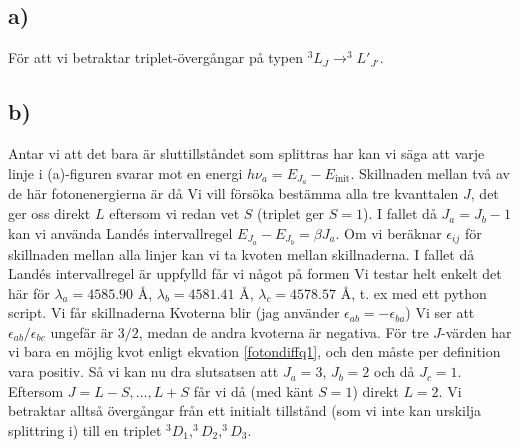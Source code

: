 \subsection{a)}
För att vi betraktar triplet-övergångar på typen $^3L_J \rightarrow  ^3L'_{J'}$.

\subsection{b)}
Antar vi att det bara är sluttillståndet som splittras har kan vi säga att varje linje i (a)-figuren
svarar mot en energi $h\nu_a = E_{J_a}-E_{\text{init}}$. Skillnaden mellan två av de här fotonenergierna är då
Vi vill försöka bestämma alla tre kvanttalen $J$, det ger oss direkt $L$ eftersom vi redan vet $S$ (triplet ger $S=1$).
I fallet då $J_a = J_b-1$ kan vi använda Landés intervallregel $E_{J_a}-E_{J_b} = \beta J_a$. Om vi beräknar $\epsilon_{ij}$
för skillnaden mellan alla linjer kan vi ta kvoten mellan skillnaderna. I fallet då Landés intervallregel är uppfylld får vi
något på formen
Vi testar helt enkelt det här för $\lambda_a = 4585.90$ Å, $\lambda_b = 4581.41$ Å, $\lambda_c = 4578.57$ Å, t. ex med ett
python script. Vi får skillnaderna
Kvoterna blir (jag använder $\epsilon_{ab} = -\epsilon_{ba}$)
Vi ser att $\epsilon_{ab}/\epsilon_{bc}$ ungefär är $3/2$, medan de andra kvoterna är negativa. För tre $J$-värden har vi bara en möjlig
kvot enligt ekvation \eqref{fotondiffq1}, och den måste per definition vara positiv. Så vi kan nu dra slutsatsen att $J_a = 3$, $J_b = 2$ och då $J_c = 1$.
Eftersom $J = L-S,\dots,L+S$ får vi då (med känt $S=1$) direkt $L=2$. Vi betraktar alltså övergångar från ett initialt tillstånd
(som vi inte kan urskilja splittring i) till en triplet $^3D_1,^3D_2,^3D_3$.

